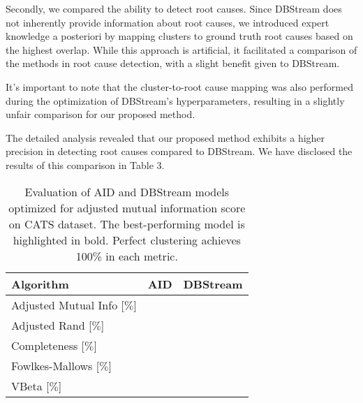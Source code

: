\documentclass{article}
\begin{document}
\begin{enumerate}
        Secondly, we compared the ability to detect root causes. Since DBStream does not inherently provide information about root causes, we introduced expert knowledge a posteriori by mapping clusters to ground truth root causes based on the highest overlap. While this approach is artificial, it facilitated a comparison of the methods in root cause detection, with a slight benefit given to DBStream.

        It's important to note that the cluster-to-root cause mapping was also performed during the optimization of DBStream's hyperparameters, resulting in a slightly unfair comparison for our proposed method.

        The detailed analysis revealed that our proposed method exhibits a higher precision in detecting root causes compared to DBStream. We have disclosed the results of this comparison in Table 3.

        \begin{table}[htbp]
            \caption{Evaluation of AID and DBStream models optimized for adjusted mutual information score on CATS dataset. The best-performing model is highlighted in bold. Perfect clustering achieves 100\% in each metric.}
            \begin{center}
                \label{tab:perf_comp_cluster}
                \begin{tabular}{|l|c|c|}
                    \hline
                    \textbf{Algorithm}          & AID               & DBStream \\
                    \hline
                    Adjusted Mutual Info [$\%$] & $\boldsymbol{}$ &         \\
                    \hline
                    Adjusted Rand [$\%$]        & $\boldsymbol{}$ &         \\
                    \hline
                    Completeness [$\%$]         & $\boldsymbol{}$ &        \\
                    \hline
                    Fowlkes-Mallows [$\%$]      & $\boldsymbol{}$ &        \\
                    \hline
                    VBeta [$\%$]                & $\boldsymbol{}$ &        \\
                    \hline
                \end{tabular}
            \end{center}
        \end{table}


\end{enumerate}
\end{document}
